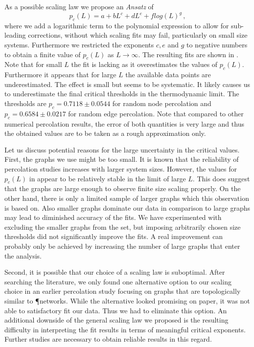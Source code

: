 		As a possible scaling law we propose an \textit{Ansatz} of
		\begin{equation}
			p_c(L) = a + b L^{c} + d L^{e} + f log(L)^{g}\,,
		\end{equation}
		where we add a logarithmic term to the polynomial expression to allow for sub-leading corrections, without which scaling fits may fail, particularly on small size systems. Furthermore we restricted the exponents $c,e$ and $g$ to negative numbers to obtain a finite value of $p_c(L)$ as $L \to \infty$. The resulting fits are shown in . Note that for small $L$ the fit is lacking as it overestimates the values of $p_c(L)$.  Furthermore it appears that for large $L$ the available data points are underestimated. The effect is small but seems to be systematic. It likely causes us to underestimate the final critical thresholds in the thermodynamic limit. The thresholds are $p_c = 0.7118 \pm 0.0544$ for random node percolation and $p_c = 0.6584 \pm 0.0217$ for random edge percolation. Note that compared to other numerical percolation results, the error of both quantities is very large and thus the obtained values are to be taken as a rough approximation only.

		Let us discuss potential reasons for the large uncertainty in the critical values. First, the graphs we use might be too small. It is known that the reliability of percolation studies increases with larger system sizes. However, the values for $p_c(L)$ in  appear to be relatively stable in the limit of large $L$. This does suggest that the graphs are large enough to observe finite size scaling properly. On the other hand, there is only a limited sample of larger graphs which this observation is based on. Also smaller graphs dominate our data in comparison to large graphs may lead to diminished accuracy of the fits. We have experimented with excluding the smaller graphs from the set, but imposing arbitrarily chosen size thresholds did not significantly improve the fits. A real improvement can probably only be achieved by increasing the number of large graphs that enter the analysis.

		Second, it is possible that our choice of a scaling law is suboptimal. After searching the literature, we only found one alternative option to our scaling choice in an earlier percolation study focusing on graphs that are topologically similar to \P networks. While the alternative looked promising on paper, it was not able to satisfactory fit our data. Thus we had to eliminate this option. An additional downside of the general scaling law we proposed is the resulting difficulty in interpreting the fit results in terms of meaningful critical exponents. Further studies are necessary to obtain reliable results in this regard.

